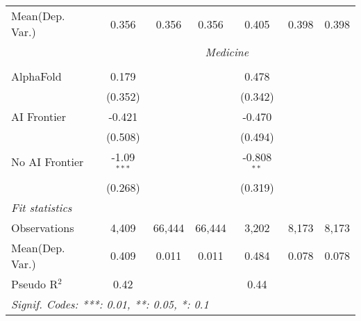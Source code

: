 \begin{tabular}{lcccccc}
Mean(Dep. Var.) & 0.356 & 0.356 & 0.356 & 0.405 & 0.398 & 0.398 \\
 & \multicolumn{6}{c}{\textit{Medicine}} \\ \\
   AlphaFold      & 0.179         &        &        & 0.478         &       &   \\   
                  & (0.352)       &        &        & (0.342)       &       &   \\   
   AI Frontier    & -0.421        &        &        & -0.470        &       &   \\   
                  & (0.508)       &        &        & (0.494)       &       &   \\   
   No AI Frontier & -1.09$^{***}$ &        &        & -0.808$^{**}$ &       &   \\   
                  & (0.268)       &        &        & (0.319)       &       &   \\   
   \midrule
   \emph{Fit statistics}\\
   Observations   & 4,409         & 66,444 & 66,444 & 3,202         & 8,173 & 8,173\\  
Mean(Dep. Var.) & 0.409 & 0.011 & 0.011 & 0.484 & 0.078 & 0.078 \\
   Pseudo R$^2$   & 0.42          &        &        & 0.44          &       & \\  
   \midrule \midrule
   \multicolumn{7}{l}{\emph{Signif. Codes: ***: 0.01, **: 0.05, *: 0.1}}\\
\end{tabular}
\par\endgroup
